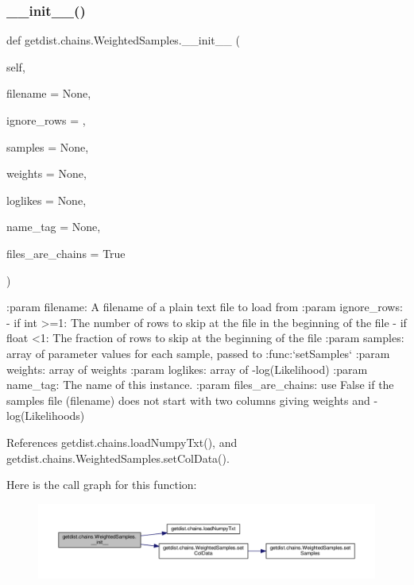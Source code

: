 \subsubsection{\texorpdfstring{\+\_\+\+\_\+init\+\_\+\+\_\+()}{\_\_init\_\_()}}
{\footnotesize\ttfamily def getdist.\+chains.\+Weighted\+Samples.\+\_\+\+\_\+init\+\_\+\+\_\+ (\begin{DoxyParamCaption}\item[{}]{self,  }\item[{}]{filename = {\ttfamily None},  }\item[{}]{ignore\+\_\+rows = {},  }\item[{}]{samples = {\ttfamily None},  }\item[{}]{weights = {\ttfamily None},  }\item[{}]{loglikes = {\ttfamily None},  }\item[{}]{name\+\_\+tag = {\ttfamily None},  }\item[{}]{files\+\_\+are\+\_\+chains = {\ttfamily True} }\end{DoxyParamCaption})}

\begin{DoxyVerb}:param filename: A filename of a plain text file to load from
:param ignore_rows: 
    - if int >=1: The number of rows to skip at the file in the beginning of the file
    - if float <1: The fraction of rows to skip at the beginning of the file
:param samples: array of parameter values for each sample, passed to :func:`setSamples`
:param weights: array of weights
:param loglikes: array of -log(Likelihood)
:param name_tag: The name of this instance.
:param files_are_chains: use False if the samples file (filename) does not start with two columns giving weights and -log(Likelihoods)
\end{DoxyVerb}
 

References getdist.\+chains.\+load\+Numpy\+Txt(), and getdist.\+chains.\+Weighted\+Samples.\+set\+Col\+Data().

Here is the call graph for this function\+:
\nopagebreak
\begin{figure}[H]
\begin{center}
\leavevmode
\includegraphics[width=350pt]{classgetdist_1_1chains_1_1WeightedSamples_a418f3fb30b5d7a6815c1d455dc3c502c_cgraph}
\end{center}
\end{figure}


